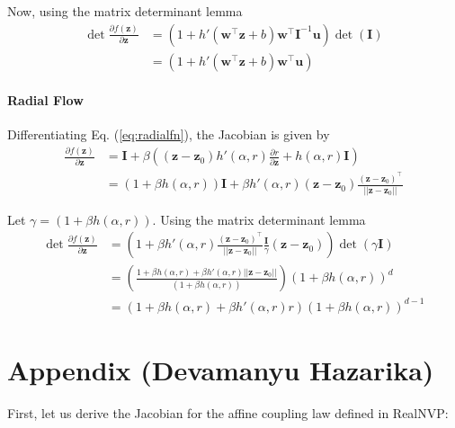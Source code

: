 \documentclass[runningheads]{llncs}
\begin{document}
Now, using the matrix determinant lemma
\begin{align}
\det\frac{\partial f(\mathbf{z})}{\partial \mathbf{z}} &= (1 + h'(\mathbf{w}^\top\mathbf{z} + b)\mathbf{w}^\top\mathbf{I}^{-1}\mathbf{u})\det(\mathbf{I})\\
&=(1 + h'(\mathbf{w}^\top\mathbf{z} + b)\mathbf{w}^\top\mathbf{u})\label{eq:planar-det}
\end{align}
\paragraph{Radial Flow} Differentiating Eq. (\ref{eq:radialfn}), the Jacobian is given by
\begin{align*}
\frac{\partial f(\mathbf{z})}{\partial \mathbf{z}} &= \mathbf{I} + \beta\left((\mathbf{z}-\mathbf{z}_0)h'(\alpha,r)\frac{\partial r}{\partial \mathbf{z}} + h(\alpha,r)\mathbf{I}\right)\\
&=(1+\beta h(\alpha,r))\mathbf{I} + \beta h'(\alpha,r)(\mathbf{z}-\mathbf{z}_0)\frac{(\mathbf{z}-\mathbf{z}_0)^\top}{||\mathbf{z}-\mathbf{z}_0||}
\end{align*}

Let $\gamma = (1+\beta h(\alpha,r))$. Using the matrix determinant lemma
\begin{align}
\det\frac{\partial f(\mathbf{z})}{\partial \mathbf{z}} &= \left(1 + \beta h'(\alpha,r)\frac{(\mathbf{z}-\mathbf{z}_0)^\top}{||\mathbf{z}-\mathbf{z}_0||}\frac{\mathbf{I}}{\gamma}(\mathbf{z}-\mathbf{z}_0)\right)\det(\gamma\mathbf{I})\\
&=\left(\frac{1 + \beta h(\alpha,r) + \beta h'(\alpha,r)||\mathbf{z}-\mathbf{z}_0||}{(1+\beta h(\alpha,r))}\right)(1+\beta h(\alpha,r))^d\\
&=\left(1 + \beta h(\alpha,r) + \beta h'(\alpha,r)r\right)(1+\beta h(\alpha,r))^{d-1}\label{eq:radial-det}
\end{align}

\section{Appendix (Devamanyu Hazarika)}

First, let us derive the Jacobian for the affine coupling law defined in RealNVP:
\end{document}
